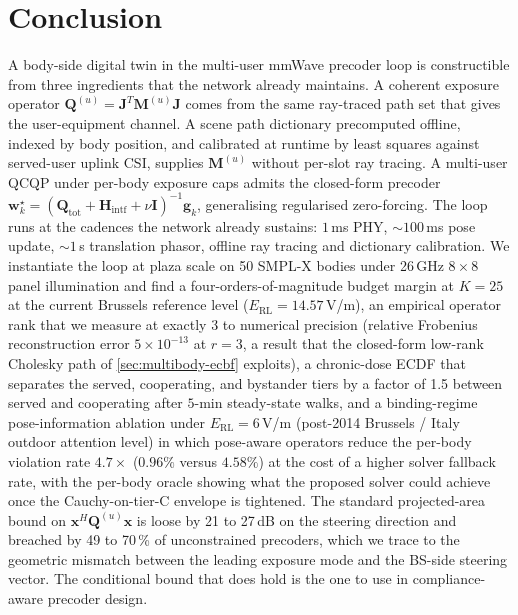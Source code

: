 \documentclass[journal,twocolumn,10pt]{IEEEtran}
\theoremstyle{plain}
\theoremstyle{remark}
\newcommand{\xx}{\mathbf{x}}
\newcommand{\ww}{\mathbf{w}}
\newcommand{\gvec}{\mathbf{g}}
\newcommand{\Qmat}{\mathbf{Q}}
\newcommand{\Mmat}{\mathbf{M}}
\newcommand{\Hintf}{\mathbf{H}_{\mathrm{intf}}}
\newcommand{\Jmat}{\mathbf{J}}
\begin{document}
\section{Conclusion}\label{sec:conclusion}

A body-side digital twin in the multi-user mmWave precoder loop is
constructible from three ingredients that the network already
maintains. A coherent exposure operator $\Qmat^{(u)} = \Jmat^T
\Mmat^{(u)} \Jmat$ comes from the same ray-traced path set that
gives the user-equipment channel. A scene path dictionary
precomputed offline, indexed by body position, and calibrated at
runtime by least squares against served-user uplink CSI, supplies
$\Mmat^{(u)}$ without per-slot ray tracing. A multi-user QCQP under
per-body exposure caps admits the closed-form precoder
$\ww_k^\star = (\Qmat_{\mathrm{tot}} + \Hintf + \nu \mathbf{I})^{-1}
\gvec_k$, generalising regularised zero-forcing. The loop runs at the cadences
the network already sustains: $1\,$ms PHY, $\sim 100\,$ms pose
update, $\sim 1\,$s translation phasor, offline ray tracing and
dictionary calibration. We instantiate the loop at plaza scale on
50 SMPL-X bodies under 26\,GHz $8 \times 8$ panel illumination and
find a four-orders-of-magnitude budget margin at $K = 25$ at
the current Brussels reference level ($E_{\mathrm{RL}} = 14.57\,$V/m),
an empirical operator rank that we measure at exactly 3 to numerical
precision (relative Frobenius reconstruction error $5\times 10^{-13}$
at $r = 3$, a result that the closed-form low-rank Cholesky path of
\cref{sec:multibody-ecbf} exploits), a chronic-dose ECDF that
separates the served, cooperating, and bystander tiers by a factor
of 1.5 between served and cooperating after $5$-min steady-state
walks, and a binding-regime pose-information ablation under
$E_{\mathrm{RL}} = 6\,$V/m (post-2014 Brussels / Italy outdoor
attention level) in which pose-aware operators reduce the per-body
violation rate $4.7\times$ ($0.96\%$ versus $4.58\%$) at the cost of
a higher solver fallback rate, with the per-body oracle showing what
the proposed solver could achieve once the Cauchy-on-tier-C
envelope is tightened. The standard
projected-area bound on $\xx^H \Qmat^{(u)} \xx$ is loose by 21 to
27\,dB on the steering direction and breached by 49 to 70\,\% of
unconstrained precoders, which we trace to the geometric mismatch
between the leading exposure mode and the BS-side steering vector.
The conditional bound that does hold is the one to use in
compliance-aware precoder design.


\appendices
\end{document}
